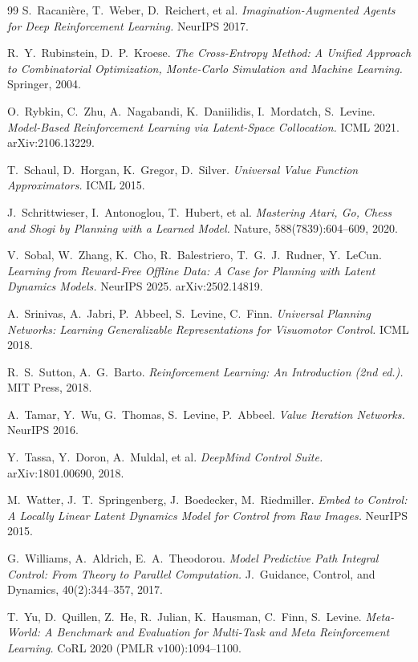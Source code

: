 \documentclass{article}
\begin{document}
\begin{thebibliography}{99}
S.~Racani{\`e}re, T.~Weber, D.~Reichert, et al.
\emph{Imagination-Augmented Agents for Deep Reinforcement Learning.}
NeurIPS 2017.

R.~Y.~Rubinstein, D.~P.~Kroese.
\emph{The Cross-Entropy Method: A Unified Approach to Combinatorial Optimization, Monte-Carlo Simulation and Machine Learning.}
Springer, 2004.

O.~Rybkin, C.~Zhu, A.~Nagabandi, K.~Daniilidis, I.~Mordatch, S.~Levine.
\emph{Model-Based Reinforcement Learning via Latent-Space Collocation.}
ICML 2021. arXiv:2106.13229.

T.~Schaul, D.~Horgan, K.~Gregor, D.~Silver.
\emph{Universal Value Function Approximators.}
ICML 2015.

J.~Schrittwieser, I.~Antonoglou, T.~Hubert, et al.
\emph{Mastering Atari, Go, Chess and Shogi by Planning with a Learned Model.}
Nature, 588(7839):604--609, 2020.

V.~Sobal, W.~Zhang, K.~Cho, R.~Balestriero, T.~G.~J.~Rudner, Y.~LeCun.
\emph{Learning from Reward-Free Offline Data: A Case for Planning with Latent Dynamics Models.}
NeurIPS 2025. arXiv:2502.14819.

A.~Srinivas, A.~Jabri, P.~Abbeel, S.~Levine, C.~Finn.
\emph{Universal Planning Networks: Learning Generalizable Representations for Visuomotor Control.}
ICML 2018.

R.~S.~Sutton, A.~G.~Barto.
\emph{Reinforcement Learning: An Introduction (2nd ed.).}
MIT Press, 2018.

A.~Tamar, Y.~Wu, G.~Thomas, S.~Levine, P.~Abbeel.
\emph{Value Iteration Networks.}
NeurIPS 2016.

Y.~Tassa, Y.~Doron, A.~Muldal, et al.
\emph{DeepMind Control Suite.}
arXiv:1801.00690, 2018.

M.~Watter, J.~T.~Springenberg, J.~Boedecker, M.~Riedmiller.
\emph{Embed to Control: A Locally Linear Latent Dynamics Model for Control from Raw Images.}
NeurIPS 2015.

G.~Williams, A.~Aldrich, E.~A.~Theodorou.
\emph{Model Predictive Path Integral Control: From Theory to Parallel Computation.}
J.~Guidance, Control, and Dynamics, 40(2):344--357, 2017.

T.~Yu, D.~Quillen, Z.~He, R.~Julian, K.~Hausman, C.~Finn, S.~Levine.
\emph{Meta-World: A Benchmark and Evaluation for Multi-Task and Meta Reinforcement Learning.}
CoRL 2020 (PMLR v100):1094--1100.


\end{thebibliography}
\end{document}
